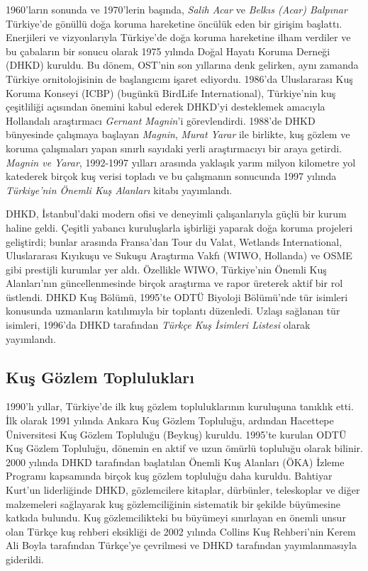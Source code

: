 \documentclass[
  a4paper,
  DIV=11,
  numbers=noendperiod]{scrreprt}
\begin{document}
1960'ların sonunda ve 1970'lerin başında, \emph{Salih Acar} ve
\emph{Belkıs (Acar) Balpınar} Türkiye'de gönüllü doğa koruma hareketine
öncülük eden bir girişim başlattı. Enerjileri ve vizyonlarıyla
Türkiye'de doğa koruma hareketine ilham verdiler ve bu çabaların bir
sonucu olarak 1975 yılında Doğal Hayatı Koruma Derneği (DHKD) kuruldu.
Bu dönem, OST'nin son yıllarına denk gelirken, aynı zamanda Türkiye
ornitolojisinin de başlangıcını işaret ediyordu. 1986'da Uluslararası
Kuş Koruma Konseyi (ICBP) (bugünkü BirdLife International), Türkiye'nin
kuş çeşitliliği açısından önemini kabul ederek DHKD'yi desteklemek
amacıyla Hollandalı araştırmacı \emph{Gernant Magnin}'i görevlendirdi.
1988'de DHKD bünyesinde çalışmaya başlayan \emph{Magnin}, \emph{Murat
Yarar} ile birlikte, kuş gözlem ve koruma çalışmaları yapan sınırlı
sayıdaki yerli araştırmacıyı bir araya getirdi. \emph{Magnin ve Yarar},
1992-1997 yılları arasında yaklaşık yarım milyon kilometre yol katederek
birçok kuş verisi topladı ve bu çalışmanın sonucunda 1997 yılında
\emph{Türkiye'nin Önemli Kuş Alanları} kitabı yayımlandı.

DHKD, İstanbul'daki modern ofisi ve deneyimli çalışanlarıyla güçlü bir
kurum haline geldi. Çeşitli yabancı kuruluşlarla işbirliği yaparak doğa
koruma projeleri geliştirdi; bunlar arasında Fransa'dan Tour du Valat,
Wetlands International, Uluslararası Kıyıkuşu ve Sukuşu Araştırma Vakfı
(WIWO, Hollanda) ve OSME gibi prestijli kurumlar yer aldı. Özellikle
WIWO, Türkiye'nin Önemli Kuş Alanları'nın güncellenmesinde birçok
araştırma ve rapor üreterek aktif bir rol üstlendi. DHKD Kuş Bölümü,
1995'te ODTÜ Biyoloji Bölümü'nde tür isimleri konusunda uzmanların
katılımıyla bir toplantı düzenledi. Uzlaşı sağlanan tür isimleri,
1996'da DHKD tarafından \emph{Türkçe Kuş İsimleri Listesi} olarak
yayımlandı.

\subsection*{Kuş Gözlem
Toplulukları}\label{kuux15f-guxf6zlem-topluluklarux131}

1990'lı yıllar, Türkiye'de ilk kuş gözlem topluluklarının kuruluşuna
tanıklık etti. İlk olarak 1991 yılında Ankara Kuş Gözlem Topluluğu,
ardından Hacettepe Üniversitesi Kuş Gözlem Topluluğu (Beykuş) kuruldu.
1995'te kurulan ODTÜ Kuş Gözlem Topluluğu, dönemin en aktif ve uzun
ömürlü topluluğu olarak bilinir. 2000 yılında DHKD tarafından başlatılan
Önemli Kuş Alanları (ÖKA) İzleme Programı kapsamında birçok kuş gözlem
topluluğu daha kuruldu. Bahtiyar Kurt'un liderliğinde DHKD, gözlemcilere
kitaplar, dürbünler, teleskoplar ve diğer malzemeleri sağlayarak kuş
gözlemciliğinin sistematik bir şekilde büyümesine katkıda bulundu. Kuş
gözlemcilikteki bu büyümeyi sınırlayan en önemli unsur olan Türkçe kuş
rehberi eksikliği de 2002 yılında Collins Kuş Rehberi'nin Kerem Ali
Boyla tarafından Türkçe'ye çevrilmesi ve DHKD tarafından yayımlanmasıyla
giderildi.
\end{document}
